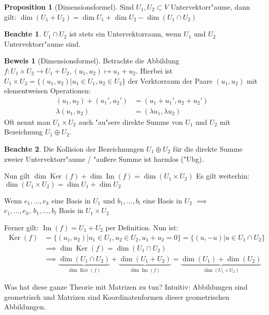 \documentclass[oneside,fontsize=11pt,paper=a4,BCOR=0mm,DIV=12,automark,headsepline]{scrbook}
\newcommand{\gq}[1]{\glqq{}#1\grqq{}} %
\DeclareMathOperator{\mKer}{Ker}
\DeclareMathOperator{\mIm}{Im}
\theoremstyle{remark}
\theoremstyle{definition}
\newtheorem*{notte}{Beachte}
\newtheorem*{proposition}{Proposition}
\theoremstyle{definition}
\newtheorem*{prof}{Beweis}
\theoremstyle{remark}
\begin{document}
\begin{proposition}[Dimensionsformel]
  Sind \(U_1, U_2 \subset V\) Untervektorr"aume, dann gilt: \(\dim(U_1 +U_2) =\dim U_1 + \dim U_2 - \dim (U_1\cap U_2)\)
\end{proposition}
\begin{notte}
  \(U_1\cap U_2\) ist stets ein Untervektorraum, wenn \(U_1\) und \(U_2\) Untervektorr"aume sind.
\end{notte}
\begin{prof}[Dimensionsformel] 

  Betrachte die Abbildung \(f: U_1 \times U_2 \to U_1 + U_2, (u_1, u_2) \mapsto u_1 + u_2 \). Hierbei ist \(U_1\times U_2 = \{(u_1, u_2) | u_1 \in U_1, u_2 \in U_2 \} \) der Verktorraum der Paare \((u_1, u_2)\) mit
  elementweisen Operationen:
  \begin{align*}
    (u_1, u_2) + (u_1', u_2') &= (u_1 + u_1', u_2 + u_2') \\
    \lambda (u_1, u_2) &= (\lambda u_1, \lambda u_2)
  \end{align*}
  Oft nennt man \(U_1 \times U_2\) auch \gq{"au"sere direkte Summe} von \(U_1\) und \(U_2\) mit Bezeichnung \(U_1 \oplus U_2\).
  \begin{notte}Die Kollision der
    Bezeichnungen \(U_1\oplus U_2\) für die direkte Summe zweier Untervektorr"aume / "außere Summe ist harmlos ("Ubg).
  \end{notte}

  Nun gilt \(\dim \mKer(f) + \dim\mIm(f) = \dim(U_1\times U_2) \) 
  Es gilt weiterhin: \(\dim(U_1 \times U_2) = \dim U_1 + \dim U_2 \)
  
  Wenn \(e_1, \dots, e_k \) eine Basis in \(U_1\) und \(b_1, \dots, b_l \) eine Basis in \(U_2\) \(\implies\) \(e_1, \dots, e_k,\, b_1, \dots, b_l\) Basis in \(U_1\times U_2\)

  Ferner gilt: \(\mIm(f) = U_1 + U_2\) per Definition. Nun ist:
  \begin{align*}
    \mKer(f) &= \{(u_1, u_2) | u_1 \in U_1, u_2\in U_2, u_1 + u_2 = 0\} = \{(u, -u)| u \in U_1 \cap U_2 \}\\
             &\implies \dim\mKer (f) = \dim(U_1 \cap U_2)\\
             &\implies \underbrace{\dim(U_1 \cap U_2)}_{\dim\mKer(f)} + \underbrace{\dim(U_1 + U_2)}_{\dim\mIm(f)} = \underbrace{\dim(U_1) + \dim(U_2)}_{\dim (U_1\times U_2)}
  \end{align*}
\end{prof}

Was hat diese ganze Theorie mit Matrizen zu tun? Intuitiv: Abbildungen sind
\gq{geometrisch} und Matrizen sind Koordinatenformen dieser geometrischen
Abbildungen.
\end{document}

